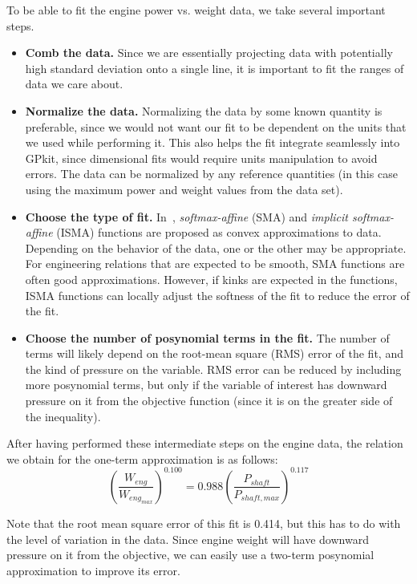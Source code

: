 To be able to fit the engine power vs. weight data, we take several important steps.
\begin{itemize}
    \item \textbf{Comb the data.} Since we are essentially projecting
    data with potentially high standard deviation onto a single line,
    it is important to fit the ranges of data we care about.
    \item \textbf{Normalize the data.} Normalizing the data
	by some known quantity is preferable, since we would not want our fit to be dependent on the
	units that we used while performing it. This also helps the fit integrate
    seamlessly into GPkit, since dimensional fits would require units manipulation
    to avoid errors. The data can be normalized by any
    reference quantities (in this case using the maximum power and weight values
    from the data set).
    \item \textbf{Choose the type of fit.} In~\cite{gpfitpaper}, \textit{softmax-affine}
    (SMA) and \textit{implicit softmax-affine} (ISMA)
    functions are proposed as convex approximations
    to data. Depending on the behavior of the data, one or the other
    may be appropriate. For engineering relations that are expected to be smooth, SMA
    functions are often good approximations. However, if kinks are expected in the
    functions, ISMA functions can locally adjust the softness of the fit to
    reduce the error of the fit.
    \item \textbf{Choose the number of posynomial terms in the fit.} The number of
    terms will likely depend on the root-mean square (RMS) error of the fit, and
    the kind of pressure on the variable. RMS error can be reduced by including
    more posynomial terms, but only if the variable of interest has downward
    pressure on it from the objective function (since it is on the greater side
    of the inequality).
\end{itemize}

After having performed these intermediate steps on the engine data,
the relation we obtain for the one-term approximation is as follows:
\begin{equation}
	(\frac{W_{eng}}{W_{eng_{max}}})^{0.100} = 0.988 (\frac{P_{shaft}}{P_{shaft,max}})^{0.117}
\end{equation}

Note that the root mean square error of this fit is 0.414, but this has to do with 
the level of variation in the data. Since engine weight will have downward pressure
on it from the objective, we can easily use a two-term posynomial approximation to 
improve its error. 

